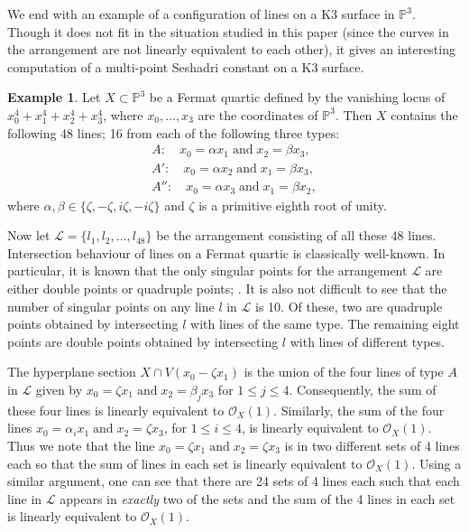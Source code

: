 \documentclass[12pt,reqno]{amsart}
\theoremstyle{plain}
\numberwithin{equation}{section}
\theoremstyle{definition}
\newtheorem{example}[theorem]{Example}
\begin{document}
We end with an example of a configuration of lines on a K3 surface in $\mathbb{P}^3$. Though it does
not fit in the situation studied in this paper (since the curves in the arrangement are not
linearly equivalent to each other), it gives an interesting computation of a multi-point Seshadri
constant on a K3 surface.

\begin{example}
		Let $X \subset \mathbb{P}^3$ be a Fermat quartic defined by the vanishing locus of $x_0^4 + x_1^4 + x_2^4 + x_3^4$, where $x_0, \ldots, x_3$ are the coordinates of $\mathbb{P}^3$. 
		Then $X$ contains the following 48 lines; 
  16 from each of the following three types: 
		\begin{eqnarray*}
			A: \quad x_0 = \alpha x_1 \; \text{and} \; x_2 = \beta x_3, \\
			A': \quad x_0 = \alpha x_2 \; \text{and} \; x_1 = \beta x_3, \\
			A'': \quad x_0 = \alpha x_3 \; \text{and} \; x_1 = \beta x_2,
		\end{eqnarray*}
		where $\alpha, \beta \in \{\zeta, -\zeta, i\zeta, -i\zeta \}$ and $\zeta$ is a primitive eighth root of unity. %
		

Now let $\mathcal{L} = \{l_1,l_2, \ldots,  l_{48}\}$ be the arrangement consisting of all these 48 lines. 
Intersection behaviour of lines on a Fermat quartic is classically well-known. 
In particular, it is known that the only singular points for the arrangement $\mathcal{L}$ are either double points or quadruple points; \cite[Example 3.3]{Pok1}. It is also not difficult to see that the number of singular points on any line $l$ in $\mathcal{L}$ is 10. Of these, two are quadruple points obtained by intersecting $l$ with lines of the same type. The remaining eight points are double points obtained by intersecting $l$ with lines of different types. 


The hyperplane section $X \cap V(x_0 - \zeta x_1)$ is the union of the four lines of type $A$ in $\mathcal{L}$ 
given by  
$x_0 = \zeta x_1 \; \text{and} \; x_2 = \beta_j x_3$
for  $1\leq j \leq 4$. Consequently, the sum of these four lines is linearly equivalent to $\mathcal{O}_X(1)$. Similarly, the sum of the four lines 
$x_0 = \alpha_i x_1 \; \text{and} \; x_2 = \zeta x_3$, 
for $1\leq i \leq 4$, 
is linearly equivalent to $\mathcal{O}_X(1)$. Thus we note that the line 
$x_0 = \zeta x_1 \; \text{and} \; x_2 = \zeta x_3$ is in two different sets of 4 lines each so that the sum of lines in each set is linearly equivalent to $\mathcal{O}_X(1)$.
Using a similar argument, one can see that there are 24 sets of 4 lines each such that each line in $\mathcal{L}$ appears in \textit{exactly} two of the sets and the sum of the 4 lines in each set is linearly equivalent to $\mathcal{O}_X(1)$.



\end{example}
\end{document}
